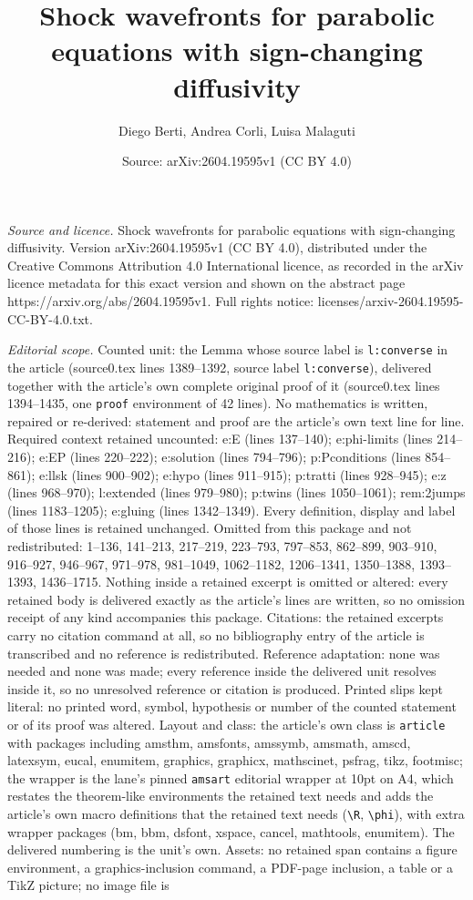 \documentclass[10pt,a4paper]{amsart}
\title[Shock wavefronts for parabolic equations with sign-changing ]{Shock wavefronts for parabolic equations with sign-changing diffusivity}
\author{Diego Berti, Andrea Corli, Luisa Malaguti}
\date{Source: arXiv:2604.19595v1 (CC BY 4.0)}
\begin{document}
\maketitle

\noindent\emph{Source and licence.} Shock wavefronts for parabolic equations with sign-changing diffusivity. Version arXiv:2604.19595v1 (CC BY 4.0), distributed under the Creative Commons Attribution 4.0 International licence, as recorded in the arXiv licence metadata for this exact version and shown on the abstract page https://arxiv.org/abs/2604.19595v1. Full rights notice: licenses/arxiv-2604.19595-CC-BY-4.0.txt.\par\smallskip

\noindent\textit{Editorial scope.} Counted unit: the Lemma whose source label is \texttt{l:converse} in the article (source0.tex lines 1389--1392, source label \texttt{l:converse}), delivered together with the article's own complete original proof of it (source0.tex lines 1394--1435, one \texttt{proof} environment of 42 lines). No mathematics is written, repaired or re-derived: statement and proof are the article's own text line for line. Required context retained uncounted: e:E (lines 137--140); e:phi-limits (lines 214--216); e:EP (lines 220--222); e:solution (lines 794--796); p:Pconditions (lines 854--861); e:llsk (lines 900--902); e:hypo (lines 911--915); p:tratti (lines 928--945); e:z (lines 968--970); l:extended (lines 979--980); p:twins (lines 1050--1061); rem:2jumps (lines 1183--1205); e:gluing (lines 1342--1349). Every definition, display and label of those lines is retained unchanged. Omitted from this package and not redistributed: 1--136, 141--213, 217--219, 223--793, 797--853, 862--899, 903--910, 916--927, 946--967, 971--978, 981--1049, 1062--1182, 1206--1341, 1350--1388, 1393--1393, 1436--1715. Nothing inside a retained excerpt is omitted or altered: every retained body is delivered exactly as the article's lines are written, so no omission receipt of any kind accompanies this package. Citations: the retained excerpts carry no citation command at all, so no bibliography entry of the article is transcribed and no reference is redistributed. Reference adaptation: none was needed and none was made; every reference inside the delivered unit resolves inside it, so no unresolved reference or citation is produced. Printed slips kept literal: no printed word, symbol, hypothesis or number of the counted statement or of its proof was altered. Layout and class: the article's own class is \texttt{article} with packages including amsthm, amsfonts, amssymb, amsmath, amscd, latexsym, eucal, enumitem, graphics, graphicx, mathscinet, psfrag, tikz, footmisc; the wrapper is the lane's pinned \texttt{amsart} editorial wrapper at 10pt on A4, which restates the theorem-like environments the retained text needs and adds the article's own macro definitions that the retained text needs (\texttt{\textbackslash R}, \texttt{\textbackslash phi}), with extra wrapper packages (bm, bbm, dsfont, xspace, cancel, mathtools, enumitem). The delivered numbering is the unit's own. Assets: no retained span contains a figure environment, a graphics-inclusion command, a PDF-page inclusion, a table or a TikZ picture; no image file is 
\end{document}
